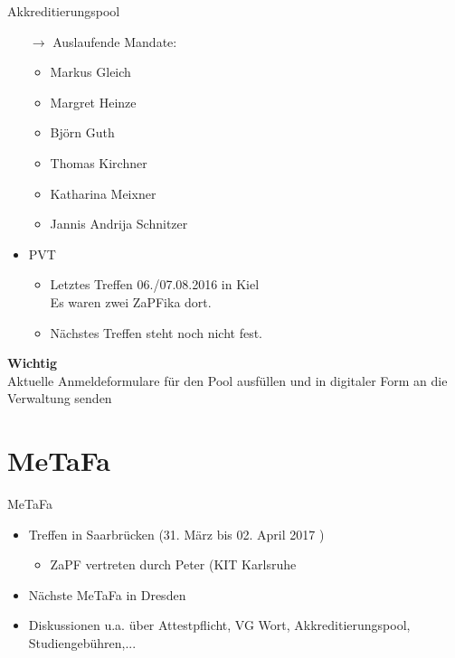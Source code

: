 \documentclass[compress, aspectratio=169]{beamer}
\begin{document}
\begin{frame}{Akkreditierungspool}
  \begin{itemize}
    \item[$\rightarrow$] Auslaufende Mandate:
      \begin{itemize}
      \item Markus Gleich
      \item Margret Heinze
      \item Björn Guth
      \item Thomas Kirchner
      \item Katharina Meixner
      \item Jannis Andrija Schnitzer
      \end{itemize}
    \item PVT
      \begin{itemize}
      \item Letztes Treffen 06./07.08.2016 in Kiel\\
        Es waren zwei ZaPFika dort.
      \item Nächstes Treffen steht noch nicht fest.
      \end{itemize}
    \end{itemize}
\end{frame}

\begin{frame}
  \begin{framed}
    \begin{center}
      {\Huge \textbf{Wichtig}}\\
      \vspace{0.5cm}
      {\Large Aktuelle Anmeldeformulare für den Pool ausfüllen und in digitaler Form an die Verwaltung senden}
      \end{center}
      \end{framed}
\end{frame}

\section{MeTaFa}

\begin{frame}{MeTaFa}
  \begin{itemize}
  \item Treffen in Saarbrücken (31. März bis 02. April 2017 )
    \begin{itemize}
    \item ZaPF vertreten durch Peter (KIT Karlsruhe
    \end{itemize}
  \item Nächste MeTaFa in Dresden
  \item Diskussionen u.a. über Attestpflicht, VG Wort, Akkreditierungspool, Studiengebühren,...
  \end{itemize}
\end{frame}
\end{document}
